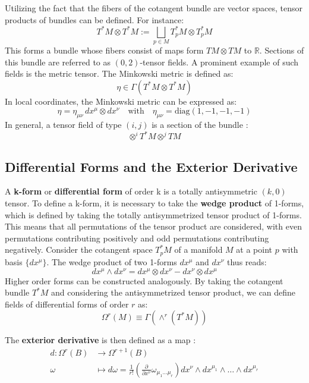 Utilizing the fact that the fibers of the cotangent bundle are vector spaces, tensor products of bundles can be defined. For instance:
\[
T^*M \otimes T^*M := \bigsqcup_{p \in M} T_p^*M \otimes T_p^*M
\]
This forms a bundle whose fibers consist of maps form $TM \otimes TM$ to $\mathbb{R}$. Sections of this bundle are referred to as \((0,2)\)-tensor fields. A prominent example of such fields is the metric tensor. The Minkowski metric is defined as:
\[
\eta \in \Gamma(T^*M \otimes T^*M)
\]
In local coordinates, the Minkowski metric can be expressed as:
\[
\eta = \eta_{\mu\nu} \, dx^\mu \otimes dx^\nu
\quad \text{with} \quad \eta_{\mu\nu} = \text{diag}(1, -1, -1, -1)
\]
In general, a tensor field of type $(i,j)$ is a section of the bundle \cite{NakaharaGeometrytopologyphysics2005}:
\[ \otimes^iT^*M \otimes^jTM \]


\subsection{Differential Forms and the Exterior Derivative}
A \textbf{k-form} or \textbf{differential form} of order k is a totally antisymmetric $(k,0)$ tensor. To define a k-form, it is necessary to take the \textbf{wedge product} of 1-forms, which is defined by taking the totally antisymmetrized tensor product of 1-forms. This means that all permutations of the tensor product are considered, with even permutations contributing positively and odd permutations contributing negatively. Consider the cotangent space $T_p^*M$ of a manifold $M$ at a point $p$ with basis $\{dx^\mu\}$. The wedge product of two 1-forms \(dx^\mu\) and \(dx^\nu\) thus reads:
\[
dx^\mu \wedge dx^\nu = dx^\mu \otimes dx^\nu - dx^\nu \otimes dx^\mu
\]
Higher order forms can be constructed analogously. By taking the cotangent bundle \(T^*M\) and considering the antisymmetrized tensor product, we can define fields of differential forms of order \(r\) as:
\[\Omega^r(M) \equiv \Gamma(\wedge^r (T^*M))\]

The \textbf{exterior derivative} is then defined as a map \cite{NakaharaGeometrytopologyphysics2005}:
\begin{align*}
  d: \Omega^r(B) &\to \Omega^{r+1}(B) \\
  \omega &\mapsto d\omega = \frac{1}{r!}\left( \frac{\partial}{ \partial x^\nu} \omega_{\mu_1 \dots \mu_r} \right) dx^\nu \wedge dx^{\mu_1} \wedge \dots \wedge dx^{\mu_r}
\end{align*}

